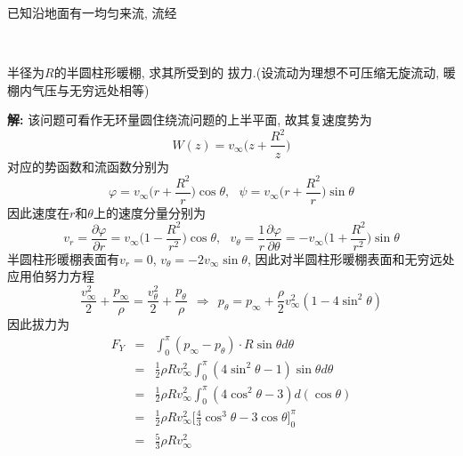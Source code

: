 \begin{problem}[问题6.4]已知沿地面有一均匀来流, 流经
\vspace{-2em}
\begin{multicols}{2}
~

半径为$R$的半圆柱形暖棚, 求其所受到的
拔力.(设流动为理想不可压缩无旋流动, 暖棚内气压与无穷远处相等)

\begin{center}

\end{center}
\end{multicols}
\end{problem}

\begin{solution}
\textbf{解:} 该问题可看作无环量圆住绕流问题的上半平面, 故其复速度势为
\[
W(z) = v_\infty\big(z+\frac{R^2}{z}\big)
\]
对应的势函数和流函数分别为
\[
\varphi = v_\infty\big(r+\frac{R^2}{r}\big)\cos\theta,{~~~} \psi = v_\infty\big(r+\frac{R^2}{r}\big)\sin\theta
\]
因此速度在$r$和$\theta$上的速度分量分别为
\[
v_r = \frac{\partial\varphi}{\partial r} = v_\infty\big(1-\frac{R^2}{r^2}\big)\cos\theta,{~~~}
v_\theta = \frac{1}{r}\frac{\partial\varphi}{\partial\theta} = -v_\infty\big(1+\frac{R^2}{r^2}\big)\sin\theta
\]
半圆柱形暖棚表面有$v_r=0$, $v_\theta=-2v_\infty\sin\theta$, 因此对半圆柱形暖棚表面和无穷远处
应用伯努力方程
\[
\frac{v_\infty^2}{2} + \frac{p_\infty}{\rho} = \frac{v_\theta^2}{2} + \frac{p_\theta}{\rho}
{~~}\Longrightarrow{~~} p_\theta = p_\infty + \frac{\rho}{2}v_\infty^2(1-4\sin^2\theta)
\]
因此拔力为
\begin{eqnarray}
F_Y &=& \int_0^\pi (p_\infty - p_\theta)\cdot R\sin\theta d\theta\nonumber\\
&=& \frac{1}{2} \rho Rv_\infty^2\int_0^\pi (4\sin^2\theta-1)\sin\theta d\theta\nonumber\\
&=& \frac{1}{2} \rho Rv_\infty^2\int_0^\pi (4\cos^2\theta-3)d(\cos\theta)\nonumber\\
&=& \frac{1}{2} \rho Rv_\infty^2\Big[
\frac{4}{3}\cos^3\theta-3\cos\theta
\Big]_0^\pi\nonumber\\
&=& \frac{5}{3}\rho Rv_\infty^2\nonumber
\end{eqnarray}
\end{solution}
